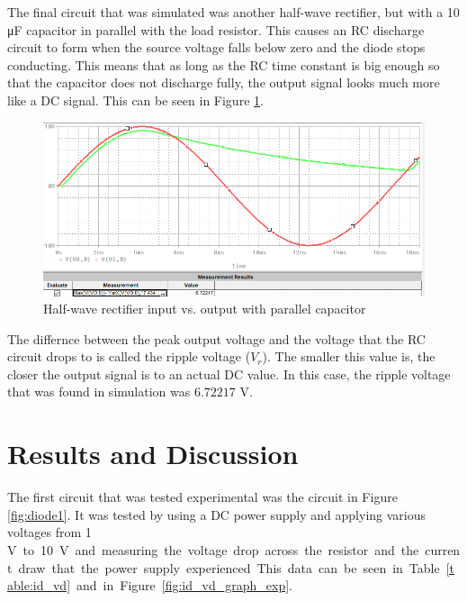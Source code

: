 \documentclass[11pt]{article}
\begin{document}
	\hfill \break

	The final circuit that was simulated was another half-wave rectifier, but with a
	10 \si{\micro\farad} capacitor in parallel with the load resistor. This causes an 
	RC discharge circuit to form when the source voltage falls below zero and the diode
	stops conducting. This means that as long as the RC time constant is big enough 
	so that the capacitor does not discharge fully, the output signal looks much 
	more like a DC signal. This can be seen in Figure 
	\ref{fig:half-wave_rectifier_cap_graph}.

	\begin{figure}[H]
		\centering
		\includegraphics[width=\textwidth]{half_wave_rectifier_cap_graph.png}
		\caption{Half-wave rectifier input vs. output with parallel capacitor}
		\label{fig:half-wave_rectifier_cap_graph}
	\end{figure}

	The differnce between the peak output voltage and the voltage that the RC circuit
	drops to is called the ripple voltage (\(V_r\)). The smaller this value is, the
	closer the output signal is to an actual DC value. In this case, the ripple 
	voltage that was found in simulation was \(6.72217\) \si\volt.

	\section{Results and Discussion}
	The first circuit that was tested experimental was the circuit in Figure
	\ref{fig:diode1}. It was tested by using a DC power supply and applying
	various voltages from 1 \si\volt to 10 \si\volt and measuring the voltage
	drop across the resistor and the current draw that the power supply 
	experienced. This data can be seen in Table \ref{table:id_vd} and 
	in Figure \ref{fig:id_vd_graph_exp}.
\end{document}
